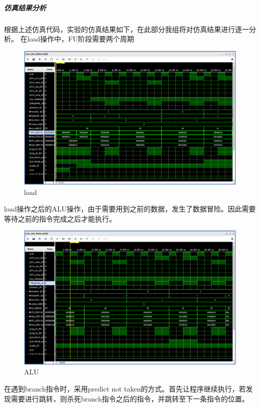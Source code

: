 \subparagraph{仿真结果分析}
根据上述仿真代码，实验的仿真结果如下，在此部分我组将对仿真结果进行逐一分析。
在load操作中，FU阶段需要两个周期
\begin{figure}[H] %
	\centering %
	\includegraphics[width=1.0\textwidth]{figs/1.png} %
	\caption{load} %
	\label{Fig.4} %
\end{figure}
load操作之后的ALU操作，由于需要用到之前的数据，发生了数据冒险。因此需要等待之前的指令完成之后才能执行。

\begin{figure}[H]
    \centering
    \includegraphics[width=1.0\textwidth]{figs/2.png}
    \caption{ALU}
    \label{Fig.5}
\end{figure}

在遇到branch指令时，采用predict not taken的方式。首先让程序继续执行，若发现需要进行跳转，则杀死branch指令之后的指令，并跳转至下一条指令的位置。

